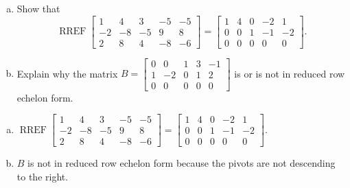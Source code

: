 
\begin{exerciseStatement}

\begin{enumerate}[(a)]
\item Show that \[\operatorname{RREF} \left[\begin{array}{ccccc}
1 & 4 & 3 & -5 & -5 \\
-2 & -8 & -5 & 9 & 8 \\
2 & 8 & 4 & -8 & -6
\end{array}\right] = \left[\begin{array}{ccccc}
1 & 4 & 0 & -2 & 1 \\
0 & 0 & 1 & -1 & -2 \\
0 & 0 & 0 & 0 & 0
\end{array}\right] .\]
\item Explain why the matrix \(B= \left[\begin{array}{ccccc}
0 & 0 & 1 & 3 & -1 \\
1 & -2 & 0 & 1 & 2 \\
0 & 0 & 0 & 0 & 0
\end{array}\right] \) is or is not in reduced row echelon form.
\end{enumerate}
    
\end{exerciseStatement}
    
\begin{exerciseAnswer} 

\begin{enumerate}[(a)]
\item \(\operatorname{RREF} \left[\begin{array}{ccccc}
1 & 4 & 3 & -5 & -5 \\
-2 & -8 & -5 & 9 & 8 \\
2 & 8 & 4 & -8 & -6
\end{array}\right] = \left[\begin{array}{ccccc}
1 & 4 & 0 & -2 & 1 \\
0 & 0 & 1 & -1 & -2 \\
0 & 0 & 0 & 0 & 0
\end{array}\right] .\)
\item \(B\) is not in reduced row echelon form because the pivots are not descending to the right. 
\end{enumerate}
    
\end{exerciseAnswer}
    
